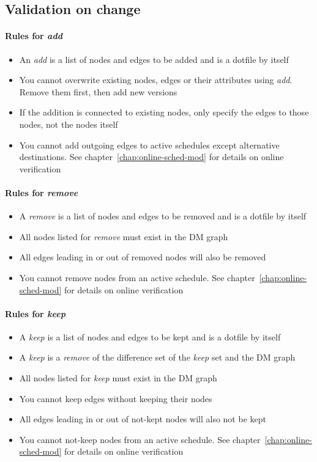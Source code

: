 \newpage
\subsection{Validation on change}
\label{ssec:val-on-change}
\paragraph{Rules for \emph{add}}
\begin{itemize}
  \item{An \emph{add} is a list of nodes and edges to be added and is a dotfile by itself}
  \item{You cannot overwrite existing nodes, edges or their attributes using \emph{add}. Remove them first, then add new versions}
  \item{If the addition is connected to existing nodes, only specify the edges to those nodes, not the nodes itself}
  \item{You cannot add outgoing edges to active schedules except alternative destinations. See chapter~\ref{chap:online-sched-mod} for details on online verification}
\end{itemize}

\paragraph{Rules for \emph{remove}}
\begin{itemize}
  \item{A \emph{remove} is a list of nodes and edges to be removed and is a dotfile by itself}
  \item{All nodes listed for \emph{remove} must exist in the DM graph}
  \item{All edges leading in or out of removed nodes will also be removed}
  \item{You cannot remove nodes from an active schedule. See chapter~\ref{chap:online-sched-mod} for details on online verification}
\end{itemize}

\paragraph{Rules for \emph{keep}}
\begin{itemize}
  \item{A \emph{keep} is a list of nodes and edges to be kept and is a dotfile by itself}
  \item{A \emph{keep} is a \emph{remove} of the difference set of the \emph{keep} set and the DM graph}
  \item{All nodes listed for \emph{keep} must exist in the DM graph}
  \item{You cannot keep edges without keeping their nodes}
  \item{All edges leading in or out of not-kept nodes will also not be kept}
  \item{You cannot not-keep nodes from an active schedule. See chapter~\ref{chap:online-sched-mod} for details on online verification}
\end{itemize}

